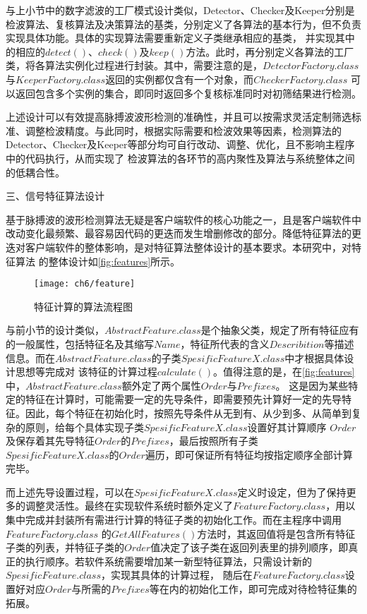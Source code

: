 与上小节中的数字滤波的工厂模式设计类似，Detector、Checker及Keeper分别是检波算法、复核算法及决策算法的基类，分别定义了各算法的基本行为，但不负责实现具体功能。具体的实现算法需要重新定义子类继承相应的基类，
并实现其中的相应的$detect()$、$check()$及$keep()$方法。此时，再分别定义各算法的工厂类，将各算法实例化过程进行封装。其中，需要注意的是，$DetectorFactory.class$与$KeeperFactory.class$返回的实例都仅含有一个对象，而$CheckerFactory.class$
可以返回包含多个实例的集合，即同时返回多个复核标准同时对初筛结果进行检测。

上述设计可以有效提高脉搏波波形检测的准确性，并且可以按需求灵活定制筛选标准、调整检波精度。与此同时，根据实际需要和检波效果等因素，检测算法的Detector、Checker及Keeper等部分均可自行改动、调整、优化，且不影响主程序中的代码执行，从而实现了
检波算法的各环节的高内聚性及算法与系统整体之间的低耦合性。

三、信号特征算法设计

基于脉搏波的波形检测算法无疑是客户端软件的核心功能之一，且是客户端软件中改动变化最频繁、最容易因代码的更迭而发生增删修改的部分。降低特征算法的更迭对客户端软件的整体影响，是对特征算法整体设计的基本要求。本研究中，对特征算法
的整体设计如\autoref{fig:features}所示。
\begin{figure}[htbp]
    \centering
    \texttt{[image: ch6/feature]}
    \caption{\label{fig:features}特征计算的算法流程图}
\end{figure}

与前小节的设计类似，$AbstractFeature.class$是个抽象父类，规定了所有特征应有的一般属性，包括特征名及其缩写$Name$，特征所代表的含义$Describition$等描述信息。而在$AbstractFeature.class$的子类$SpesificFeatureX.class$中才根据具体设计思想等完成对
该特征的计算过程$calculate()$。值得注意的是，在\autoref{fig:features}中，$AbstractFeature.class$额外定了两个属性$Order$与$Prefixes$。
这是因为某些特定的特征在计算时，可能需要一定的先导条件，即需要预先计算好一定的先导特征。因此，每个特征在初始化时，按照先导条件从无到有、从少到多、从简单到复杂的原则，给每个具体实现子类$SpesificFeatureX.class$设置好其计算顺序
$Order$及保存着其先导特征$Order$的$Prefixes$，最后按照所有子类$SpesificFeatureX.class$的$Order$遍历，即可保证所有特征均按指定顺序全部计算完毕。

而上述先导设置过程，可以在$SpesificFeatureX.class$定义时设定，但为了保持更多的调整灵活性。最终在实现软件系统时额外定义了$FeatureFactory.class$，用以集中完成并封装所有需进行计算的特征子类的初始化工作。而在主程序中调用$FeatureFactory.class$
的$GetAllFeatures()$方法时，其返回值将是包含所有特征子类的列表，并特征子类的$Order$值决定了该子类在返回列表里的排列顺序，即真正的执行顺序。若软件系统需要增加某一新型特征算法，只需设计新的$SpesificFeature.class$，实现其具体的计算过程，
随后在$FeatureFactory.class$设置好对应$Order$与所需的$Prefixes$等在内的初始化工作，即可完成对待检特征集的拓展。

